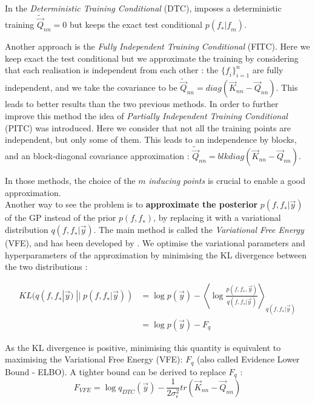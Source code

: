  In the \textit{Deterministic Training Conditional} (DTC), imposes a deterministic training $\tilde{\vec{Q}}_{nn} = 0$ but keeps the exact test conditional $p(\mathit{f}_* | \mathit{f}_m)$. 
 
 Another approach is the \textit{Fully Independent Training Conditional} (FITC). Here we keep exact the test conditional but we approximate the training by considering that each realisation is independent from each other : the $\{\mathit{f}_i\}^n_{i=1}$ are fully independent, and we take the covariance to be $\tilde{\vec{Q}}_{nn} = diag(\vec{K}_{nn} - \vec{Q}_{nn} ) $. This leads to better results than the two previous methods. 
 In order to further improve this method the idea of \textit{Partially Independent Training Conditional} (PITC) was introduced. Here we consider that not all the training points are independent, but only some of them. This leads to an independence by blocks, and an block-diagonal covariance approximation : $\tilde{\vec{Q}}_{nn} = blkdiag(\vec{K}_{nn} - \vec{Q}_{nn} ) $. 
 
In those methods, the choice of the $m$ \textit{inducing points} is crucial to enable a good approximation. \\


Another way to see the problem is to \textbf{approximate the posterior} $p(\mathit{f,f_*} | \vec{y})$ of the GP instead of the prior $p(\mathit{f,f_*})$, by replacing it with a variational distribution  $q(\mathit{f,f_*} | \vec{y})$. The main method is called the \textit{Variational Free Energy} (VFE), and has been developed by \cite{titsias_variational_2009}. We optimise the variational parameters and hyperparameters of the  approximation by minimising the KL divergence between the two distributions : 


\begin{align}
    KL(q(\mathit{f,f_*} | \vec{y})\; || \;  p(\mathit{f,f_*} | \vec{y})) &= \log p(\vec{y}) - \left\langle  \log \frac{p(\mathit{f,f_*},\vec{y})}{q(\mathit{f,f_*} | \vec{y})}\right\rangle_{q(\mathit{f,f_*} | \vec{y})} \\
    &= \log p(\vec{y}) - F_q
    \label{equ:vfe_kl}
    \end{align}  
    
As the KL divergence is positive, minimising this quantity is equivalent to maximising the Variational Free Energy (VFE): $F_q$ (also called Evidence Lower Bound - ELBO). A tighter bound can be derived to replace $F_q$ : 
\begin{equation}
    F_{VFE} = \log q_{DTC}(\vec{y}) - \frac{1}{2\sigma_\epsilon^2} tr(\vec{K}_{nn} - \vec{Q}_{nn})
\end{equation}

